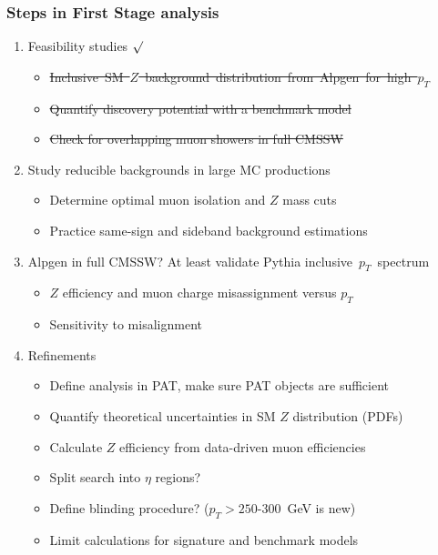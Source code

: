 \documentclass[compress]{beamer}
\begin{document}
\begin{frame}
\frametitle{Steps in First Stage analysis}
\begin{enumerate}

\item Feasibility studies $\surd$
\begin{itemize}
\item \mbox{\sout{Inclusive SM $Z$ background distribution from Alpgen for high $p_T$}\hspace{-1 cm}}
\item \sout{Quantify discovery potential with a benchmark model}
\item \sout{Check for overlapping muon showers in full CMSSW}
\end{itemize}

\item Study reducible backgrounds in large MC productions
\begin{itemize}
\item Determine optimal muon isolation and $Z$ mass cuts
\item Practice same-sign and sideband background estimations
\end{itemize}

\item Alpgen in full CMSSW?  At least validate Pythia \mbox{inclusive $p_T$ spectrum\hspace{-1 cm}}
\begin{itemize}
\item $Z$ efficiency and muon charge misassignment versus $p_T$
\item Sensitivity to misalignment
\end{itemize}

\item Refinements
\begin{itemize}
\item Define analysis in PAT, make sure PAT objects are sufficient
\item Quantify theoretical uncertainties in SM $Z$ distribution (PDFs)
\item Calculate $Z$ efficiency from data-driven muon efficiencies
\item Split search into $\eta$ regions?
\item Define blinding procedure?  ($p_T > 250$-$300$~GeV is new)
\item Limit calculations for signature and benchmark models
\end{itemize}

\end{enumerate}
\end{frame}
\end{document}
